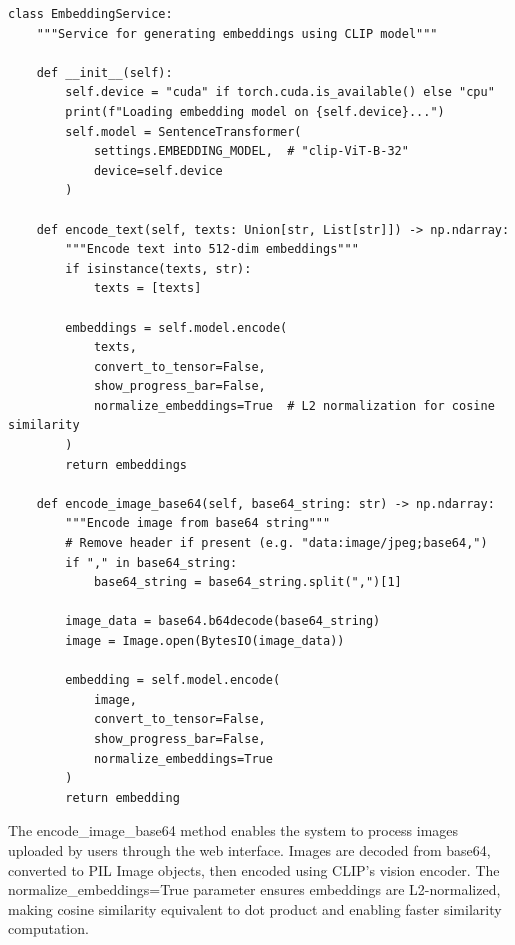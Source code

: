 \begin{lstlisting}
class EmbeddingService:
    """Service for generating embeddings using CLIP model"""
    
    def __init__(self):
        self.device = "cuda" if torch.cuda.is_available() else "cpu"
        print(f"Loading embedding model on {self.device}...")
        self.model = SentenceTransformer(
            settings.EMBEDDING_MODEL,  # "clip-ViT-B-32"
            device=self.device
        )
    
    def encode_text(self, texts: Union[str, List[str]]) -> np.ndarray:
        """Encode text into 512-dim embeddings"""
        if isinstance(texts, str):
            texts = [texts]
        
        embeddings = self.model.encode(
            texts,
            convert_to_tensor=False,
            show_progress_bar=False,
            normalize_embeddings=True  # L2 normalization for cosine similarity
        )
        return embeddings
    
    def encode_image_base64(self, base64_string: str) -> np.ndarray:
        """Encode image from base64 string"""
        # Remove header if present (e.g. "data:image/jpeg;base64,")
        if "," in base64_string:
            base64_string = base64_string.split(",")[1]
        
        image_data = base64.b64decode(base64_string)
        image = Image.open(BytesIO(image_data))
        
        embedding = self.model.encode(
            image,
            convert_to_tensor=False,
            show_progress_bar=False,
            normalize_embeddings=True
        )
        return embedding
\end{lstlisting}

The encode\_image\_base64 method enables the system to process images uploaded by users through the web interface. Images are decoded from base64, converted to PIL Image objects, then encoded using CLIP's vision encoder. The normalize\_embeddings=True parameter ensures embeddings are L2-normalized, making cosine similarity equivalent to dot product and enabling faster similarity computation.

